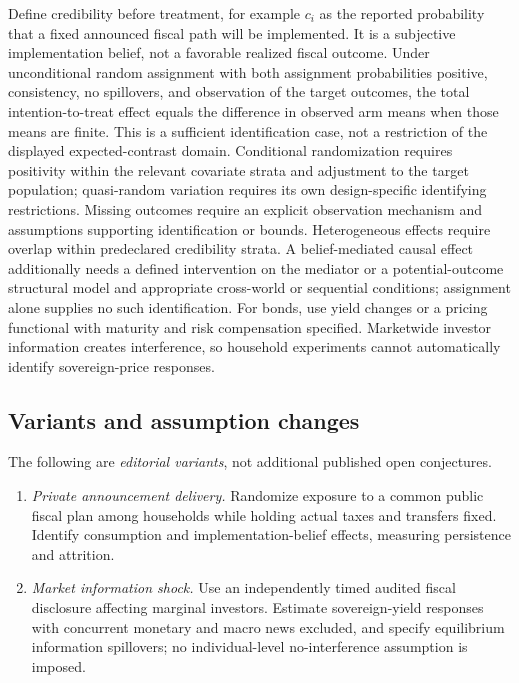 \documentclass[11pt,a4paper]{article}
\begin{document}
Define credibility before treatment, for example \(c_i\) as the reported probability that a fixed announced fiscal path will be implemented. It is a subjective implementation belief, not a favorable realized fiscal outcome. Under unconditional random assignment with both assignment probabilities positive, consistency, no spillovers, and observation of the target outcomes, the total intention-to-treat effect equals the difference in observed arm means when those means are finite. This is a sufficient identification case, not a restriction of the displayed expected-contrast domain. Conditional randomization requires positivity within the relevant covariate strata and adjustment to the target population; quasi-random variation requires its own design-specific identifying restrictions. Missing outcomes require an explicit observation mechanism and assumptions supporting identification or bounds. Heterogeneous effects require overlap within predeclared credibility strata. A belief-mediated causal effect additionally needs a defined intervention on the mediator or a potential-outcome structural model and appropriate cross-world or sequential conditions; assignment alone supplies no such identification. For bonds, use yield changes or a pricing functional with maturity and risk compensation specified. Marketwide investor information creates interference, so household experiments cannot automatically identify sovereign-price responses.
\subsection*{Variants and assumption changes}
The following are \emph{editorial variants}, not additional published open conjectures.
\begin{enumerate}
\item \emph{Private announcement delivery.} Randomize exposure to a common public fiscal plan among households while holding actual taxes and transfers fixed. Identify consumption and implementation-belief effects, measuring persistence and attrition.
\item \emph{Market information shock.} Use an independently timed audited fiscal disclosure affecting marginal investors. Estimate sovereign-yield responses with concurrent monetary and macro news excluded, and specify equilibrium information spillovers; no individual-level no-interference assumption is imposed.
\end{enumerate}
\end{document}
